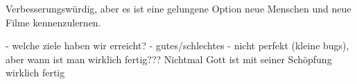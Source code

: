 


Verbesserungswürdig, aber es ist eine gelungene Option neue Menschen und neue Filme kennenzulernen.


- welche ziele haben wir erreicht?
- gutes/schlechtes
- nicht perfekt (kleine bugs), aber wann ist man wirklich fertig??? Nichtmal Gott ist mit seiner Schöpfung wirklich fertig